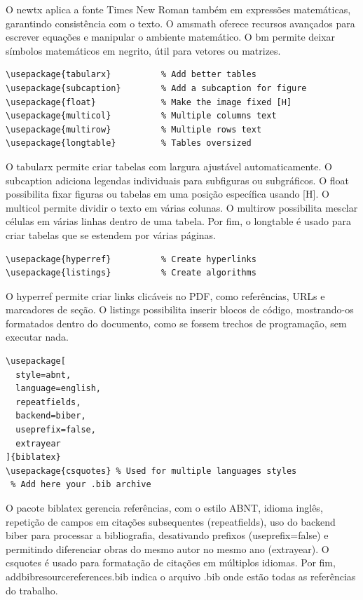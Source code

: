 O newtx aplica a fonte Times New Roman também em expressões matemáticas, garantindo consistência com o texto. O amsmath oferece recursos avançados para escrever equações e manipular o ambiente matemático. O bm permite deixar símbolos matemáticos em negrito, útil para vetores ou matrizes.

\begin{lstlisting}[firstnumber=last]
\usepackage{tabularx}          % Add better tables
\usepackage{subcaption}        % Add a subcaption for figure
\usepackage{float}             % Make the image fixed [H]
\usepackage{multicol}          % Multiple columns text
\usepackage{multirow}          % Multiple rows text
\usepackage{longtable}         % Tables oversized
\end{lstlisting}

O tabularx permite criar tabelas com largura ajustável automaticamente. O subcaption adiciona legendas individuais para subfiguras ou subgráficos. O float possibilita fixar figuras ou tabelas em uma posição específica usando [H]. O multicol permite dividir o texto em várias colunas. O multirow possibilita mesclar células em várias linhas dentro de uma tabela. Por fim, o longtable é usado para criar tabelas que se estendem por várias páginas.

\begin{lstlisting}[firstnumber=last]
\usepackage{hyperref}          % Create hyperlinks
\usepackage{listings}          % Create algorithms
\end{lstlisting}

O hyperref permite criar links clicáveis no PDF, como referências, URLs e marcadores de seção. O listings possibilita inserir blocos de código, mostrando-os formatados dentro do documento, como se fossem trechos de programação, sem executar nada.

\begin{lstlisting}[firstnumber=last]
\usepackage[
  style=abnt,
  language=english, 
  repeatfields,
  backend=biber,
  useprefix=false,
  extrayear
]{biblatex}
\usepackage{csquotes} % Used for multiple languages styles
 % Add here your .bib archive
\end{lstlisting}

O pacote biblatex gerencia referências, com o estilo ABNT, idioma inglês, repetição de campos em citações subsequentes (repeatfields), uso do backend biber para processar a bibliografia, desativando prefixos (useprefix=false) e permitindo diferenciar obras do mesmo autor no mesmo ano (extrayear). O csquotes é usado para formatação de citações em múltiplos idiomas. Por fim, addbibresource{references.bib} indica o arquivo .bib onde estão todas as referências do trabalho.

